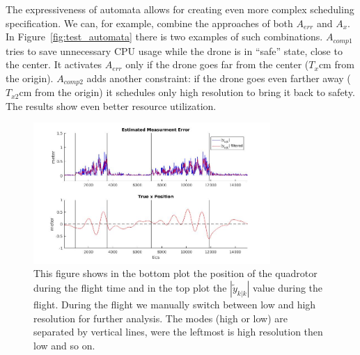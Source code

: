 \documentclass{sig-alternate-ipsn13}
\begin{document}
The expressiveness of automata allows for creating even more complex scheduling specification. We can, for example, combine the approaches of both $A_{err}$ and $A_{x}$.
In Figure~\ref{fig:test_automata} there is two examples of such combinations. $A_{comp1}$ tries to save unnecessary CPU usage while the drone is in ``safe'' state, close to the center. It activates $A_{err}$ only if the drone goes far from the center ($T_{x}$cm from the origin).
$A_{comp2}$ adds another constraint: if the drone goes even farther away ($T_{x2}$cm from the origin) it schedules only high resolution to bring it back to safety.
The results show even better resource utilization.

\begin{figure}[htbp]
    \centerline{\includegraphics[width=90mm]{errorVsPosition.jpg}}
    \caption{This figure shows in the bottom plot the position of the quadrotor during the flight time and in the top plot the $\left| \tilde{y}_{k|k} \right|$ value during the flight. During the flight we manually switch between low and high resolution for further analysis. The modes (high or low) are separated by vertical lines, were the leftmost is high resolution then low and so on.}
    \label{fig:testPlot}
\end{figure}
\end{document}
